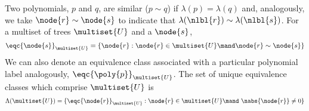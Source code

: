 \begin{definition}
  Two polynomials, $p$ and $q$, are similar ($p \sim q$) if
  $\lambda(p) = \lambda(q)$ and, analogously, we take
  $\node{r}\sim\node{s}$ to indicate that $\lambda(\nlbl{r}) \sim
  \lambda(\nlbl{s})$.  For a multiset of trees $\multiset{U}$ and a
  $\node{s}$,
  \begin{equation*}
    \eqc{\node{s}}_{\multiset{U}} = \{\node{r}: \node{r}\in\multiset{U} \mand \node{r}\sim\node{s}\}
  \end{equation*}
  We can also denote an
  equivalence class associated with a particular polynomial label
  analogously, $\eqc{\poly{p}}_{\multiset{U}}$.  The set of unique
  equivalence classes which comprise $\multiset{U}$ is
  \begin{equation}
    \Lambda(\multiset{U}) = \{\eqc{\node{r}}_{\multiset{U}}: \node{r}\in\multiset{U} \mand\ \nabs{\node{r}} \neq 0\}
  \end{equation}
\end{definition}


